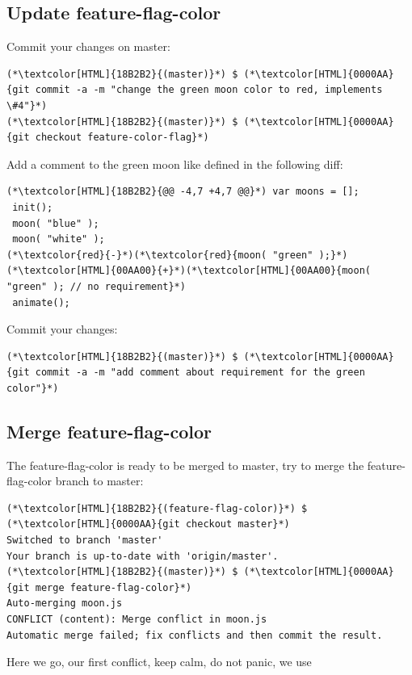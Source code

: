 \subsection{Update feature-flag-color}
\begin{frame}[fragile]
    \subslidetitle
  Commit your changes on master:
\begin{lstlisting}
(*\textcolor[HTML]{18B2B2}{(master)}*) $ (*\textcolor[HTML]{0000AA}{git commit -a -m "change the green moon color to red, implements \#4"}*)
(*\textcolor[HTML]{18B2B2}{(master)}*) $ (*\textcolor[HTML]{0000AA}{git checkout feature-color-flag}*)
\end{lstlisting}

  Add a comment to the green moon like defined in the following diff:
  \begin{lstlisting}
(*\textcolor[HTML]{18B2B2}{@@ -4,7 +4,7 @@}*) var moons = [];
 init();
 moon( "blue" );
 moon( "white" );
(*\textcolor{red}{-}*)(*\textcolor{red}{moon( "green" );}*)
(*\textcolor[HTML]{00AA00}{+}*)(*\textcolor[HTML]{00AA00}{moon( "green" ); // no requirement}*)
 animate();
\end{lstlisting}

  Commit your changes:
  \begin{lstlisting}
(*\textcolor[HTML]{18B2B2}{(master)}*) $ (*\textcolor[HTML]{0000AA}{git commit -a -m "add comment about requirement for the green color"}*)
\end{lstlisting}
\end{frame}

\subsection{Merge feature-flag-color}
\begin{frame}[fragile]
    \subslidetitle

  The feature-flag-color is ready to be merged to master, try to merge the feature-flag-color branch to master:
  \begin{lstlisting}
(*\textcolor[HTML]{18B2B2}{(feature-flag-color)}*) $ (*\textcolor[HTML]{0000AA}{git checkout master}*)
Switched to branch 'master'
Your branch is up-to-date with 'origin/master'.
(*\textcolor[HTML]{18B2B2}{(master)}*) $ (*\textcolor[HTML]{0000AA}{git merge feature-flag-color}*)
Auto-merging moon.js
CONFLICT (content): Merge conflict in moon.js
Automatic merge failed; fix conflicts and then commit the result.
\end{lstlisting}

Here we go, our first conflict, keep calm, do not panic, we use 
\end{frame}

